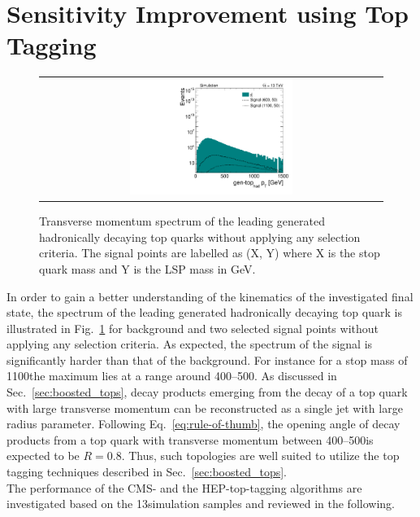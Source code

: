\section{Sensitivity Improvement using Top Tagging}
\label{sec:stop_toptagging}
\begin{figure}[!t]
  \centering
  \begin{tabular}{c}
                \includegraphics[width=0.49\textwidth]{figures/Stop_NoCuts_leading_had_t_ptgen.pdf} 
  \end{tabular}
  \caption{Transverse momentum spectrum of the leading generated hadronically decaying top quarks without applying any selection criteria. The signal points are labelled as (X, Y) where X is the stop quark mass and Y is the LSP mass in GeV.}
  \label{fig:stop_gen_top_pt}
\end{figure} 
In order to gain a better understanding of the kinematics of the investigated final state, the \pt spectrum of the leading generated  hadronically decaying top quark is illustrated in Fig.~\ref{fig:stop_gen_top_pt} for \ttbar background and two selected signal points without applying any selection criteria. As expected, the \pt spectrum of the signal is significantly harder than that of the \ttbar background. For instance for a stop mass of 1100\gev the maximum lies at a \pt range around 400--500\gev. As discussed in Sec.~\ref{sec:boosted_tops}, decay products emerging from the decay of a top quark with large transverse momentum can be reconstructed as a single jet with large radius parameter. Following Eq.~\ref{eq:rule-of-thumb}, the opening angle of decay products from a top quark with transverse momentum between 400--500\gev is expected to be $R = 0.8$. Thus, such topologies are well suited to utilize the top tagging techniques described in Sec.~\ref{sec:boosted_tops}. \\
The performance of the CMS- and the HEP-top-tagging algorithms are investigated based on the 13\tev simulation samples and reviewed in the following. 
